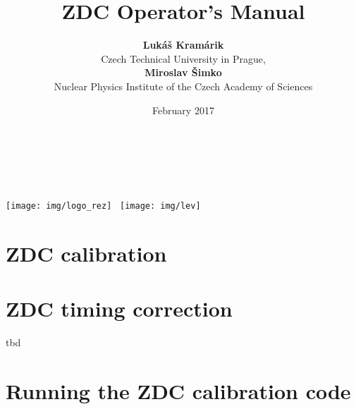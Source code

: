 \documentclass[a4paper,10pt]{report}
\title{ZDC Operator's Manual}
\author{\textbf{Lukáš Kramárik}\\
Czech Technical University in Prague,\\[.5cm] 
\textbf{Miroslav Šimko}\\[.4cm]
Nuclear Physics Institute of the Czech Academy of Sciences}
\date{February 2017}
\begin{document}
\makeatletter
\begin{titlepage}
\begin{center}
{\huge \bfseries  \@title }\\[2cm]
{\LARGE  \@author}\\[4ex] 
{\large \@date}\\[50ex]
\texttt{[image: img/logo\_rez]}\hspace*{3cm}~%
\texttt{[image: img/lev]}
\end{center}
\end{titlepage}
\makeatother
\thispagestyle{empty}
\newpage

\thispagestyle{empty}
\newpage

\tableofcontents


\chapter{ZDC calibration\label{calibration}}


\chapter{ZDC timing correction}
tbd

\chapter{Running the ZDC calibration code\label{code}}




\end{document}
